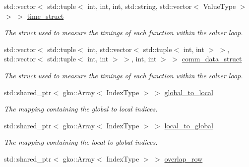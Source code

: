 \begin{DoxyCompactItemize}
std\+::vector$<$ std\+::tuple$<$ int, int, int, std\+::string, std\+::vector$<$ Value\+Type $>$ $>$ $>$ \hyperlink{structschwz_1_1Metadata_a50bb2b3dc28c0eabbd423a069e560951}{time\+\_\+struct}
\begin{DoxyCompactList}\small\item\em The struct used to measure the timings of each function within the solver loop. \end{DoxyCompactList}\item 
\mbox{\label{structschwz_1_1Metadata_a54f774e70eb42b84f63f702262b99fa6}} 
std\+::vector$<$ std\+::tuple$<$ int, std\+::vector$<$ std\+::tuple$<$ int, int $>$ $>$, std\+::vector$<$ std\+::tuple$<$ int, int $>$ $>$, int, int $>$ $>$ \hyperlink{structschwz_1_1Metadata_a54f774e70eb42b84f63f702262b99fa6}{comm\+\_\+data\+\_\+struct}
\begin{DoxyCompactList}\small\item\em The struct used to measure the timings of each function within the solver loop. \end{DoxyCompactList}\item 
\mbox{\label{structschwz_1_1Metadata_a0ad24ef496c5e99cb0c5c2e8af3a1fab}} 
std\+::shared\+\_\+ptr$<$ gko\+::\+Array$<$ Index\+Type $>$ $>$ \hyperlink{structschwz_1_1Metadata_a0ad24ef496c5e99cb0c5c2e8af3a1fab}{global\+\_\+to\+\_\+local}
\begin{DoxyCompactList}\small\item\em The mapping containing the global to local indices. \end{DoxyCompactList}\item 
\mbox{\label{structschwz_1_1Metadata_acadbecaaeb439bc25e079a595fb084fa}} 
std\+::shared\+\_\+ptr$<$ gko\+::\+Array$<$ Index\+Type $>$ $>$ \hyperlink{structschwz_1_1Metadata_acadbecaaeb439bc25e079a595fb084fa}{local\+\_\+to\+\_\+global}
\begin{DoxyCompactList}\small\item\em The mapping containing the local to global indices. \end{DoxyCompactList}\item 
\mbox{\label{structschwz_1_1Metadata_a4637081afa35e53f7fab1b58b7ec760f}} 
std\+::shared\+\_\+ptr$<$ gko\+::\+Array$<$ Index\+Type $>$ $>$ \hyperlink{structschwz_1_1Metadata_a4637081afa35e53f7fab1b58b7ec760f}{overlap\+\_\+row}

\end{DoxyCompactItemize}
